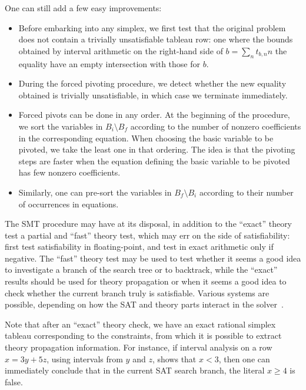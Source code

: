 One can still add a few easy improvements:
\begin{itemize}
\item Before embarking into any simplex, we first test that the original problem does not contain a trivially unsatisfiable tableau row: one where the bounds obtained by interval arithmetic on the right-hand side of $b = \sum_n t_{b,n} n$ the equality have an empty intersection with those for $b$.
\item During the forced pivoting procedure, we detect whether the new equality obtained is trivially unsatisfiable, in which case we terminate immediately.
\item Forced pivots can be done in any order. At the beginning of the procedure, we sort the variables in $B_i \setminus B_f$ according to the number of nonzero coefficients in the corresponding equation. When choosing the basic variable to be pivoted, we take the least one in that ordering. The idea is that the pivoting steps are faster when the equation defining the basic variable to be pivoted has few nonzero coefficients.
\item Similarly, one can pre-sort the variables in $B_f \setminus B_i$ according to their number of occurrences in equations.
\end{itemize}

The SMT procedure may have at its disposal, in addition to the ``exact'' theory test a partial and  ``fast'' theory test, which may err on the side of satisfiability: first test satisfiability in floating-point, and test in exact arithmetic only if negative. The ``fast'' theory test may be used to test whether it seems a good idea to investigate a branch of the search tree or to backtrack, while the ``exact'' results should be used for theory propagation or when it seems a good idea to check whether the current branch truly is satisfiable. Various systems are possible, depending on how the SAT and theory parts interact in the solver~\cite{Faure_et_al_SAT08}.

Note that after an ``exact'' theory check, we have an exact rational simplex tableau corresponding to the constraints, from which it is possible to extract theory propagation information. For instance, if interval analysis on a row $x = 3y+5z$, using intervals from $y$ and $z$, shows that $x < 3$, then one can immediately conclude that in the current SAT search branch, the literal $x \geq 4$ is false.

